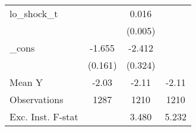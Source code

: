 {\begin{tabular}{l*{3}{c}}
\addlinespace
lo\_shock\_t  &                     &       0.016\sym{***}&                     \\
            &                     &     (0.005)         &                     \\
\addlinespace
\_cons      &      -1.655\sym{***}&      -2.412\sym{***}&                     \\
            &     (0.161)         &     (0.324)         &                     \\
\midrule
Mean Y      &       -2.03         &       -2.11         &       -2.11         \\
Observations&        1287         &        1210         &        1210         \\
Exc. Inst. F-stat&                     &       3.480         &       5.232         \\
\bottomrule
\end{tabular}
}

